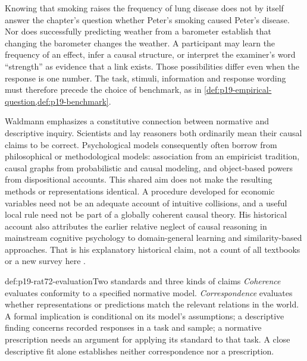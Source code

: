 Knowing that smoking raises the frequency of lung disease does not by
itself answer the chapter's question whether Peter's smoking caused
Peter's disease. Nor does successfully predicting weather from a
barometer establish that changing the barometer changes the weather.
A participant may learn the frequency of an effect, infer a causal
structure, or interpret the examiner's word ``strength'' as evidence
that a link exists. Those possibilities differ even when the response
is one number. The task, stimuli, information and response wording
must therefore precede the choice of benchmark, as in
\cref{def:p19-empirical-question,def:p19-benchmark}.

Waldmann emphasizes a constitutive connection between normative and
descriptive inquiry. Scientists and lay reasoners both ordinarily mean
their causal claims to be correct. Psychological models consequently
often borrow from philosophical or methodological models: association
from an empiricist tradition, causal graphs from probabilistic and
causal modeling, and object-based powers from dispositional accounts.
This shared aim does not make the resulting methods or representations
identical. A procedure developed for economic variables need not be an
adequate account of intuitive collisions, and a useful local rule need
not be part of a globally coherent causal theory. His historical account
also attributes the earlier relative neglect of causal reasoning in
mainstream cognitive psychology to domain-general learning and
similarity-based approaches. That is his explanatory historical claim,
not a count of all textbooks or a new survey here
\cite[Secs.~1--2, pp.~439--440]{Waldmann2021EverydayCausal}.

\begin{hbconvention}{def:p19-rat72-evaluation}{Two standards and three kinds of claims}
\emph{Coherence} evaluates conformity to a specified normative model.
\emph{Correspondence} evaluates whether representations or predictions
match the relevant relations in the world. A formal implication is
conditional on its model's assumptions; a descriptive finding concerns
recorded responses in a task and sample; a normative prescription needs
an argument for applying its standard to that task. A close descriptive
fit alone establishes neither correspondence nor a prescription.
\end{hbconvention}

